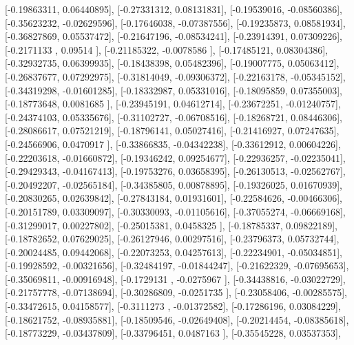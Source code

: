 \documentclass{article}
\begin{document}
       [-0.19863311,  0.06440895],
       [-0.27331312,  0.08131831],
       [-0.19539016, -0.08560386],
       [-0.35623232, -0.02629596],
       [-0.17646038, -0.07387556],
       [-0.19235873,  0.08581934],
       [-0.36827869,  0.05537472],
       [-0.21647196, -0.08534241],
       [-0.23914391,  0.07309226],
       [-0.2171133 ,  0.09514   ],
       [-0.21185322, -0.0078586 ],
       [-0.17485121,  0.08304386],
       [-0.32932735,  0.06399935],
       [-0.18438398,  0.05482396],
       [-0.19007775,  0.05063412],
       [-0.26837677,  0.07292975],
       [-0.31814049, -0.09306372],
       [-0.22163178, -0.05345152],
       [-0.34319298, -0.01601285],
       [-0.18332987,  0.05331016],
       [-0.18095859,  0.07355003],
       [-0.18773648,  0.0081685 ],
       [-0.23945191,  0.04612714],
       [-0.23672251, -0.01240757],
       [-0.24374103,  0.05335676],
       [-0.31102727, -0.06708516],
       [-0.18268721,  0.08446306],
       [-0.28086617,  0.07521219],
       [-0.18796141,  0.05027416],
       [-0.21416927,  0.07247635],
       [-0.24566906,  0.0470917 ],
       [-0.33866835, -0.04342238],
       [-0.33612912,  0.00604226],
       [-0.22203618, -0.01660872],
       [-0.19346242,  0.09254677],
       [-0.22936257, -0.02235041],
       [-0.29429343, -0.04167413],
       [-0.19753276,  0.03658395],
       [-0.26130513, -0.02562767],
       [-0.20492207, -0.02565184],
       [-0.34385805,  0.00878895],
       [-0.19326025,  0.01670939],
       [-0.20830265,  0.02639842],
       [-0.27843184,  0.01931601],
       [-0.22584626, -0.00466306],
       [-0.20151789,  0.03309097],
       [-0.30330093, -0.01105616],
       [-0.37055274, -0.06669168],
       [-0.31299017,  0.00227802],
       [-0.25015381,  0.0458325 ],
       [-0.18785337,  0.09822189],
       [-0.18782652,  0.07629025],
       [-0.26127946,  0.00297516],
       [-0.23796373,  0.05732744],
       [-0.20024485,  0.09442068],
       [-0.22073253,  0.04257613],
       [-0.22234901, -0.05034851],
       [-0.19928592, -0.00321656],
       [-0.32484197, -0.01844247],
       [-0.21622329, -0.07695653],
       [-0.35069811, -0.00916948],
       [-0.1729131 , -0.0275967 ],
       [-0.34438816, -0.03022729],
       [-0.21757778, -0.07138694],
       [-0.30286809, -0.0251735 ],
       [-0.23058406, -0.00285575],
       [-0.33472615,  0.04158577],
       [-0.3111273 , -0.01372582],
       [-0.17286196,  0.03084229],
       [-0.18621752, -0.08935881],
       [-0.18509546, -0.02649408],
       [-0.20214454, -0.08385618],
       [-0.18773229, -0.03437809],
       [-0.33796451,  0.0487163 ],
       [-0.35545228,  0.03537353],
\end{document}
